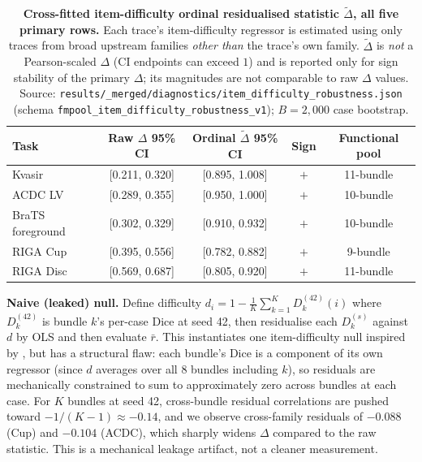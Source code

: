 \begin{table}[!htbp]
  \caption{\textbf{Cross-fitted item-difficulty ordinal residualised statistic $\tilde{\Delta}$, all five primary rows.} Each trace's item-difficulty regressor is estimated using only traces from broad upstream families \emph{other than} the trace's own family. $\tilde{\Delta}$ is \emph{not} a Pearson-scaled $\Delta$ (CI endpoints can exceed $1$) and is reported only for sign stability of the primary $\Delta$; its magnitudes are not comparable to raw $\Delta$ values. Source: \texttt{results/\_merged/diagnostics/item\_difficulty\_robustness.json} (schema \texttt{fmpool\_item\_difficulty\_robustness\_v1}); $B{=}2{,}000$ case bootstrap.}
  \label{tab:diffleak-crossfit}
  \centering\footnotesize
  \setlength{\tabcolsep}{3pt}
  \begin{tabular*}{\linewidth}{@{\extracolsep{\fill}}lcccc}
    \toprule
    Task & Raw $\Delta$ 95\% CI & Ordinal $\tilde{\Delta}$ 95\% CI & Sign & Functional pool \\
    \midrule
    Kvasir          & [0.211, 0.320] & [0.895, 1.008] & $+$ & 11-bundle \\
    ACDC LV         & [0.289, 0.355] & [0.950, 1.000] & $+$ & 10-bundle \\
    BraTS foreground & [0.302, 0.329] & [0.910, 0.932] & $+$ & 10-bundle \\
    RIGA Cup        & [0.395, 0.556] & [0.782, 0.882] & $+$ & 9-bundle  \\
    RIGA Disc       & [0.569, 0.687] & [0.805, 0.920] & $+$ & 11-bundle \\
    \bottomrule
  \end{tabular*}
\end{table}

\textbf{Naive (leaked) null.} Define difficulty $d_i = 1 - \frac{1}{K}\sum_{k=1}^{K}
D_k^{(42)}(i)$ where $D_k^{(42)}$ is bundle $k$'s per-case Dice at seed 42, then
residualise each $D_k^{(s)}$ against $d$ by OLS and then evaluate $\bar r$.
This instantiates one item-difficulty null inspired by \citet{subjectivity2026}, but has a structural flaw: each bundle's Dice
is a component of its own regressor (since $d$ averages over all 8 bundles including
$k$), so residuals are mechanically constrained to sum to approximately zero
across bundles at each case. For $K$ bundles at seed 42, cross-bundle residual correlations
are pushed toward $-1/(K-1) \approx -0.14$, and we observe cross-family residuals of
$-0.088$ (Cup) and $-0.104$ (ACDC), which sharply widens $\Delta$ compared to
the raw statistic. This is a mechanical leakage artifact, not a cleaner measurement.

